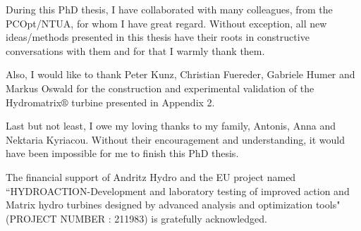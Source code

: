 \begin{acknowledgements}
During this PhD thesis, I have collaborated with many colleagues, from the PCOpt/NTUA, for whom I have great regard. Without exception, all new ideas/methods presented in this thesis have their roots in constructive conversations with them and for that I warmly thank them.   

Also, I would like to thank Peter Kunz, Christian Fuereder, Gabriele Humer and Markus Oswald for the construction and experimental validation of the Hydromatrix$\circledR$ turbine presented in Appendix 2.

Last but not least, I owe my loving thanks to my family, Antonis, Anna and Nektaria Kyriacou.  Without their encouragement and understanding, it would have been impossible for me to finish this PhD thesis. 

The financial support of Andritz Hydro and the EU project named ``HYDROACTION-Development and laboratory testing of improved action and Matrix hydro turbines designed by advanced analysis and optimization tools" (PROJECT NUMBER : 211983) is gratefully acknowledged.

\end{acknowledgements}




